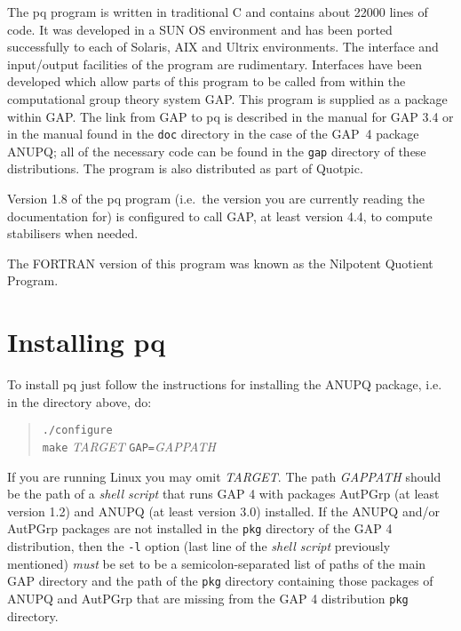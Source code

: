 \documentclass[12pt]{article}
\begin{document}
The pq program is written in traditional C and contains about 
22000 lines of code.
It was developed in a SUN OS environment and has been ported successfully
to each of Solaris, AIX and Ultrix environments.  The interface and 
input/output facilities of the program are rudimentary.  Interfaces 
have been developed which allow parts of this program to be called
from within the computational group theory system {\sf GAP}.  
This program is supplied as a package within {\sf GAP}.
The link from {\sf GAP} to pq is described in the manual
for {\sf GAP} 3.4 or in the manual found in the \texttt{doc} directory
in the case of the {\sf GAP}~4 package {\sf ANUPQ}; all of the 
necessary code can be found in the \texttt{gap} directory of these 
distributions.
The program is also distributed as part of Quotpic.

Version 1.8 of the pq program (i.e.~the version you are currently reading
the documentation for) is configured to call {\sf GAP}, at least version
4.4, to compute stabilisers when needed.

The FORTRAN version of this program was known as the 
Nilpotent Quotient Program.

\section{Installing pq}\label{sec:pq-install}

To install pq just follow the instructions for installing the {\sf ANUPQ}
package, i.e. in the directory above, do:

\begin{quote}
\verb|./configure|\\
\verb|make| \textit{TARGET} \verb|GAP=|\textit{GAPPATH}
\end{quote}

If you are running Linux you may omit \textit{TARGET}. The path 
\textit{GAPPATH} should be the path of a \emph{shell script} that runs
{\sf GAP} 4 with packages {\sf AutPGrp} (at least version 1.2) and
{\sf ANUPQ} (at least version 3.0)
installed. If the {\sf ANUPQ} and/or {\sf AutPGrp} packages are not installed
in the \texttt{pkg} directory of the {\sf GAP} 4 distribution, then
the \texttt{-l} option (last line of the \emph{shell script} previously
mentioned) \emph{must} be set to be a semicolon-separated list of
paths of the main {\sf GAP} directory and the path of the \texttt{pkg}
directory containing those packages of {\sf ANUPQ} and {\sf AutPGrp}
that are missing from the {\sf GAP} 4 distribution \texttt{pkg} directory.
\end{document}
